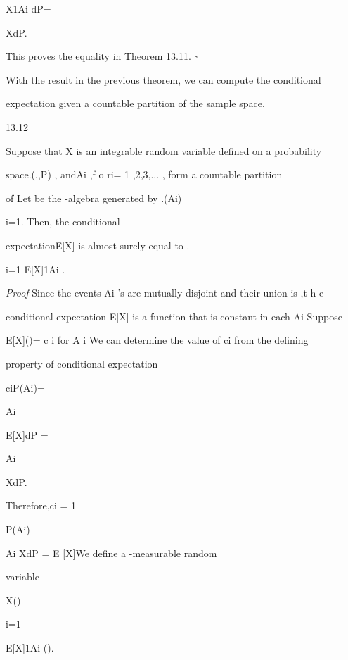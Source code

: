 X1Ai dP=

\int

\cupiAi

XdP.

This proves the equality in Theorem 13.11. \hfill $\square$

With the result in the previous theorem, we can compute the conditional

expectation given a countable partition of the sample space.

\begin{thmbox}{13.12}
\end{thmbox}

Suppose that X is an integrable random variable defined on a probability

space.(\Omega,,P) , andAi \in{},f o ri= 1 ,2,3,... , form a countable partition

of \Omega Let be the \sigma-algebra generated by .(Ai)\infty

i=1. Then, the conditional

expectationE[X\vert{}] is almost surely equal to .

\sum\infty

i=1 E[X\vertAi]1Ai .

\textit{Proof} Since the events Ai 's are mutually disjoint and their union is \Omega ,t h e

conditional expectation E[X\vert{}] is a function that is constant in each Ai Suppose

E[X\vert{}]()= c i for \in A i We can determine the value of ci from the defining

property of conditional expectation

ciP(Ai)=

\int

Ai

E[X\vert{}]dP =

\int

Ai

XdP.

Therefore,ci = 1

P(Ai)

\int

Ai XdP = E [X\vertAi]We define a -measurable random

variable

X()\coloneqq

\infty\sum

i=1

E[X\vertAi]1Ai ().

